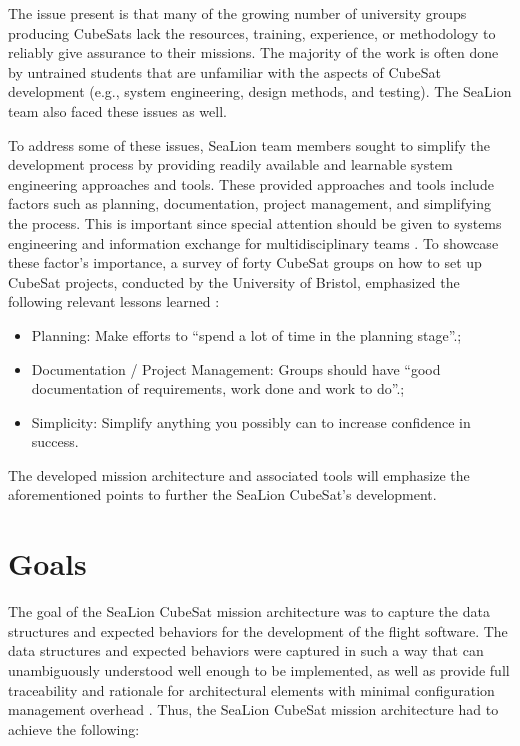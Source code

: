 \documentclass[journal,article,submit,pdftex,moreauthors]{Definitions/mdpi}
\begin{document}
The issue present is that many of the growing number of university groups producing CubeSats lack the resources, training, experience, or methodology to reliably give assurance to their missions.  The majority of the work is often done by untrained students that are unfamiliar with the aspects of CubeSat development (e.g., system engineering, design methods, and testing).  The SeaLion team also faced these issues as well.

To address some of these issues, SeaLion team members sought to simplify the development process by providing readily available and learnable system engineering approaches and tools.  These provided approaches and tools include factors such as planning, documentation, project management, and simplifying the process.  This is important since special attention should be given to systems engineering and information exchange for multidisciplinary teams \cite{aalto}.  To showcase these factor's importance, a survey of forty CubeSat groups on how to set up CubeSat projects, conducted by the University of Bristol, emphasized the following relevant lessons learned \cite{howtosetup}:

\begin{itemize}
	\item	Planning: Make efforts to “spend a lot of time in the planning stage”.;
	\item	Documentation / Project Management: Groups should have “good documentation of requirements, work done and work to do”.;
	\item	Simplicity: Simplify anything you possibly can to increase confidence in success.
\end{itemize}

The developed mission architecture and associated tools will emphasize the aforementioned points to further the SeaLion CubeSat's development.

\section{Goals}

The goal of the SeaLion CubeSat mission architecture was to capture the data structures and expected behaviors for the development of the flight software.  The data structures and expected behaviors were captured in such a way that can unambiguously understood well enough to be implemented, as well as provide full traceability and rationale for architectural elements with minimal configuration management overhead \cite{sealion_mission_architecture}.  Thus, the SeaLion CubeSat mission architecture had to achieve the following:
\end{document}
